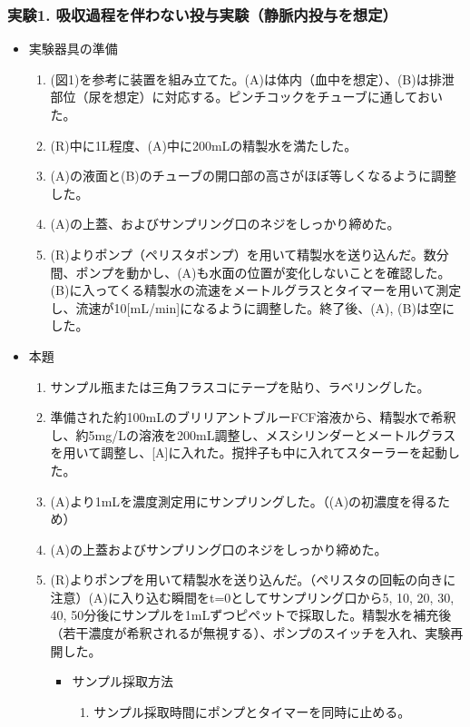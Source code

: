 \documentclass{jsarticle}
\begin{document}
\subsubsection{実験1. 吸収過程を伴わない投与実験（静脈内投与を想定）}
\begin{itemize}
\setlength{\itemsep}{10mm}
\item 実験器具の準備
    \begin{enumerate}
        \item (図1)を参考に装置を組み立てた。(A)は体内（血中を想定）、(B)は排泄部位（尿を想定）に対応する。ピンチコックをチューブに通しておいた。
        \item (R)中に1L程度、(A)中に200mLの精製水を満たした。
        \item (A)の液面と(B)のチューブの開口部の高さがほぼ等しくなるように調整した。
        \item (A)の上蓋、およびサンプリング口のネジをしっかり締めた。
        \item (R)よりポンプ（ペリスタポンプ）を用いて精製水を送り込んだ。数分間、ポンプを動かし、(A)も水面の位置が変化しないことを確認した。(B)に入ってくる精製水の流速をメートルグラスとタイマーを用いて測定し、流速が10[mL/min]になるように調整した。終了後、(A), (B)は空にした。
    \end{enumerate}
\item 本題
    \begin{enumerate}
        \item サンプル瓶または三角フラスコにテープを貼り、ラベリングした。 
        \item 準備された約100mLのブリリアントブルーFCF溶液から、精製水で希釈し、約5mg/Lの溶液を200mL調整し、メスシリンダーとメートルグラスを用いて調整し、[A]に入れた。撹拌子も中に入れてスターラーを起動した。
        \item (A)より1mLを濃度測定用にサンプリングした。（(A)の初濃度を得るため）
        \item (A)の上蓋およびサンプリング口のネジをしっかり締めた。
        \item (R)よりポンプを用いて精製水を送り込んだ。（ペリスタの回転の向きに注意）(A)に入り込む瞬間をt=0としてサンプリング口から5, 10, 20, 30, 40, 50分後にサンプルを1mLずつピペットで採取した。精製水を補充後（若干濃度が希釈されるが無視する）、ポンプのスイッチを入れ、実験再開した。
            \begin{itemize}
                \item サンプル採取方法
                    \begin{enumerate}
                        \item サンプル採取時間にポンプとタイマーを同時に止める。

\end{enumerate}
\end{itemize}
\end{enumerate}
\end{itemize}
\end{document}
